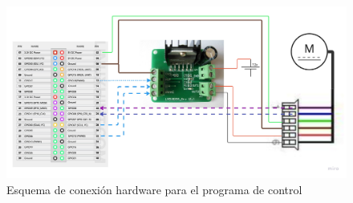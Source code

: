 \begin{figure}[H]
		\centering
		\includegraphics[scale = 0.15]{part/Proyecto_ejecutivo/memoria_constructiva/motor/img/connection diagram}
		\caption{Esquema de conexión hardware para el programa de control}\label{fig:conectionDiagram}
\end{figure}